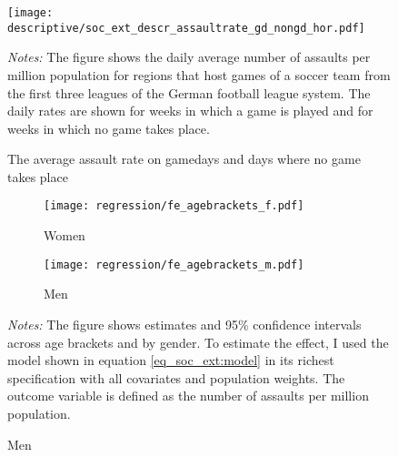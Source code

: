 \documentclass[11pt, a4paper]{article} %
\begin{document}
\vspace*{\fill}
\begin{figure}[H]\centering
	\caption{The average assault rate on gamedays and days where no game takes place}\label{fig_soc_ext:assault_rate_across_dows}
	\texttt{[image: descriptive/soc\_ext\_descr\_assaultrate\_gd\_nongd\_hor.pdf]}
	\begin{minipage}{0.95\linewidth}
		\scriptsize{\emph{Notes:} The figure shows the daily average number of assaults per million population for regions that host games of a soccer team from the first three leagues of the German football league system. The daily rates are shown for weeks in which a game is played and for weeks in which no game takes place.}
	\end{minipage}
\end{figure}
\vspace*{\fill}\clearpage



	\begin{figure}[H]\centering
		\caption{The age profile of the impact of soccer matches on the assault rate}\label{fig_soc_ext:fe_age_profile}
		\begin{subfigure}[h]{0.48\linewidth}\centering\caption{Women}
			\texttt{[image: regression/fe\_agebrackets\_f.pdf]}
		\end{subfigure}
		\begin{subfigure}[h]{0.48\linewidth}\centering\caption{Men}
			\texttt{[image: regression/fe\_agebrackets\_m.pdf]}
		\end{subfigure}
		\scriptsize
		\begin{minipage}{\linewidth}
			\emph{Notes:} The figure shows estimates and 95\% confidence intervals across age brackets and by gender. To estimate the effect, I used the model shown in equation \ref{eq_soc_ext:model} in its richest specification with all covariates and population weights. The outcome variable is defined as the number of assaults per million population.
		\end{minipage}
	\end{figure}
\end{document}
